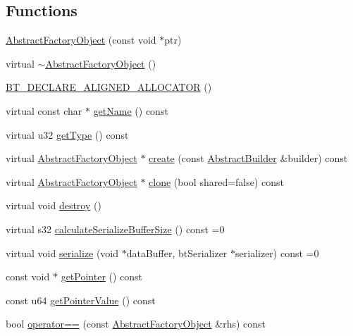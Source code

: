 \subsection*{Functions}
\begin{DoxyCompactItemize}
\item 
\hyperlink{namespacejli_aee55f3bcfb22fdfec10eadeec1618fec}{Abstract\+Factory\+Object} (const void $\ast$ptr)
\item 
virtual \hyperlink{namespacejli_a31cbc80d5096c1b894029295d6aa6c6b}{$\sim$\+Abstract\+Factory\+Object} ()
\item 
\hyperlink{namespacejli_a570a0b81268f888f69ad4c8b7fe6edae}{B\+T\+\_\+\+D\+E\+C\+L\+A\+R\+E\+\_\+\+A\+L\+I\+G\+N\+E\+D\+\_\+\+A\+L\+L\+O\+C\+A\+T\+O\+R} ()
\item 
virtual const char $\ast$ \hyperlink{namespacejli_ab59410e766fae1d158793c2a0c70be5e}{get\+Name} () const 
\item 
virtual u32 \hyperlink{namespacejli_acf2403453223c37b2cbf466e23515b6e}{get\+Type} () const 
\item 
virtual \hyperlink{namespacejli_aee55f3bcfb22fdfec10eadeec1618fec}{Abstract\+Factory\+Object} $\ast$ \hyperlink{namespacejli_a35ff60e4cedaf47ba2d630f2201ecd2c}{create} (const \hyperlink{classjli_1_1_abstract_builder}{Abstract\+Builder} \&builder) const 
\item 
virtual \hyperlink{namespacejli_aee55f3bcfb22fdfec10eadeec1618fec}{Abstract\+Factory\+Object} $\ast$ \hyperlink{namespacejli_a5100077139d5c7339602ada53ab27663}{clone} (bool shared=false) const 
\item 
virtual void \hyperlink{namespacejli_ace155e097623e08835596243e115d880}{destroy} ()
\item 
virtual s32 \hyperlink{namespacejli_a643ba9aff12ba46ade9719f4d8c08303}{calculate\+Serialize\+Buffer\+Size} () const =0
\item 
virtual void \hyperlink{namespacejli_ac4ecbc29085e60be91b1eee948d37851}{serialize} (void $\ast$data\+Buffer, bt\+Serializer $\ast$serializer) const =0
\item 
const void $\ast$ \hyperlink{namespacejli_a71c999372e54bb90fb3bfd8de1546d43}{get\+Pointer} () const 
\item 
const u64 \hyperlink{namespacejli_a9068d3abab2ee4b22d121a9af3ece697}{get\+Pointer\+Value} () const 
\item 
bool \hyperlink{namespacejli_a1ad4a8b528799f8baf60a8a63d5be679}{operator==} (const \hyperlink{namespacejli_aee55f3bcfb22fdfec10eadeec1618fec}{Abstract\+Factory\+Object} \&rhs) const 

\end{DoxyCompactItemize}
